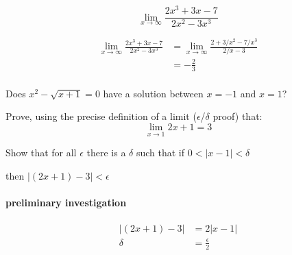 \documentclass[letterpaper]{exam}
\begin{document}
\begin{questions}


    \question[8] 
    \label{q:last_limit}
      \[
        \lim_{x \to \infty} \frac{2x^3 + 3x - 7}{2x^2 - 3x^3}
      \]

      \begin{solution}
        \begin{align*}
          \lim_{x \to \infty} \frac{2x^3 + 3x - 7}{2x^2 - 3x^3} & = \lim_{x \to \infty} \frac{2 + 3/x^2 - 7/x^3}{2/x - 3} \\
                                                                & = \boxed{ - \frac{2}{3} } \\
        \end{align*}
      \end{solution}

    \question[5] Does $x^2 - \sqrt{x + 1} = 0$ have a solution between $x = -1$ and $x = 1$?

    \question[10]
      Prove, using the precise definition of a limit ($\epsilon$/$\delta$ proof) that:
      \[
        \lim_{x \to 1} 2x + 1 = 3
      \]

      \begin{solution}
        Show that for all $\epsilon$ there is a $\delta$ such that if 
        $0 < |x - 1| < \delta$ 
        
        then $|(2x + 1) - 3| < \epsilon$

        \paragraph{preliminary investigation}
        \begin{align*}
          |(2x + 1) - 3| & = 2|x - 1| \\
          \delta         & = \frac{\epsilon}{2} \\
        \end{align*}


\end{solution}
\end{questions}
\end{document}
